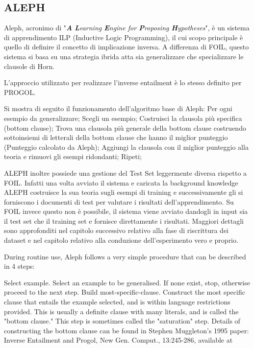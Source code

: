 \subsection{ALEPH}
Aleph, acronimo di "\emph{\textbf{A} \textbf{L}earning \textbf{E}ngine for \textbf{P}roposing \textbf{H}ypotheses}", è un sistema di apprendimento ILP (Inductive Logic Programming), il cui scopo principale è quello di  definire il concetto di implicazione inversa.
A differenza di FOIL, questo sistema si basa su una strategia ibrida atta sia generalizzare che specializzare le clausole di Horn. 

L'approccio utilizzato per realizzare l'inverse entailment è lo stesso definito per PROGOL.

Si mostra di seguito il funzionamento dell’algoritmo base di Aleph:
Per ogni esempio da generalizzare;
Scegli un esempio;
Costruisci la clausola più specifica (bottom clause);
Trova una clausola più generale della bottom clause costruendo
sottoinsiemi di letterali della bottom clause che hanno il
miglior punteggio (Punteggio calcolato da Aleph);
Aggiungi la clausola con il miglior punteggio alla teoria e
rimuovi gli esempi ridondanti;
Ripeti;

ALEPH inoltre possiede una gestione del Test Set leggermente diversa rispetto a FOIL. Infatti una volta avviato il sistema e caricata la background knowledge ALEPH costruisce la sua teoria sugli esempi di training e successivamente gli si forniscono i documenti di test per valutare i risultati dell’apprendimento. Su FOIL invece questo non è possibile, il sistema viene avviato dandogli in input sia il test set che il training set e fornisce direttamente i risultati. Maggiori dettagli sono approfonditi nel capitolo successivo relativo alla fase di riscrittura dei dataset e nel capitolo relativo alla conduzione dell’esperimento vero e proprio.

During routine use, Aleph follows a very simple procedure that can be described in 4 steps:

Select example. Select an example to be generalised. If none exist, stop, otherwise proceed to the next step.
Build most-specific-clause. Construct the most specific clause that entails the example selected, and is within language restrictions provided. This is usually a definite clause with many literals, and is called the "bottom clause." This step is sometimes called the "saturation" step. Details of constructing the bottom clause can be found in Stephen Muggleton's 1995 paper: Inverse Entailment and Progol, New Gen. Comput., 13:245-286, available at 

